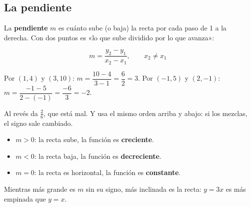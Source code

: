 \subsection{La pendiente}
La \textbf{pendiente} $m$ es cuánto sube (o baja) la recta por cada paso de 1 a la derecha. Con dos puntos es «lo que sube dividido por lo que avanza»:
\begin{clave} $$m = \frac{y_2 - y_1}{x_2 - x_1}, \qquad x_2 \neq x_1$$\end{clave}
\begin{ejemplo} Por $(1, 4)$ y $(3, 10)$: $m = \dfrac{10 - 4}{3 - 1} = \dfrac{6}{2} = 3$. Por $(-1, 5)$ y $(2, -1)$: $m = \dfrac{-1 - 5}{2 - (-1)} = \dfrac{-6}{3} = -2$.\end{ejemplo}
\begin{ojo} Al revés da $\frac{2}{6}$, que está mal. Y usa el mismo orden arriba y abajo: si los mezclas, el signo sale cambiado.\end{ojo}
\begin{center}
\end{center}
\begin{itemize}
  \item $m > 0$: la recta sube, la función es \textbf{creciente}.
  \item $m < 0$: la recta baja, la función es \textbf{decreciente}.
  \item $m = 0$: la recta es horizontal, la función es \textbf{constante}.
\end{itemize}
Mientras más grande es $m$ sin su signo, más inclinada es la recta: $y = 3x$ es más empinada que $y = x$.

